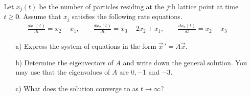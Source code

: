 \documentclass[12pt]{exam}
\begin{document}
\begin{questions}
        Let $x_j(t)$ be the number of particles residing at the $j$th lattice point at time $t \ge 0$. Assume that $x_j$ satisfies the following rate equations.
        \begin{align*} 
            \frac{dx_1(t)}{dt} = x_2 - x_1 , \qquad 
            \frac{dx_2(t)}{dt} = x_3 - 2 x_2 + x_1 , \qquad \frac{dx_3(t)}{dt} = x_2 - x_3
        \end{align*} 
        \begin{enumerate} 
            \item[a)] Express the system of equations in the form $\vec x \, ' = A \vec x$. 
                \vspace{2cm}

                \item[b)] Determine the eigenvectors of $A$ and write down the general solution. You may use that the eigenvalues of $A$ are $0, -1$ and $-3$. 
                \vspace{10cm} 
                \item[c)] What does the solution converge to as $t \to \infty$? 
        \end{enumerate}
        
        
        
        
    

\end{questions}
\end{document}
